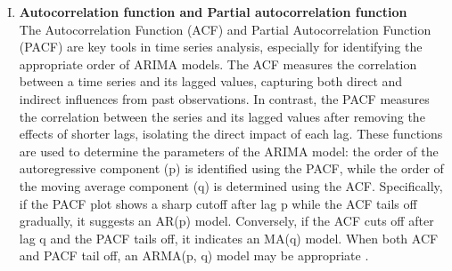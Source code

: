 \documentclass[11pt]{article}
\begin{document}
\begin{enumerate}[I. ]
    \item \textbf{Autocorrelation function and Partial autocorrelation function}\\
    The Autocorrelation Function (ACF) and Partial Autocorrelation Function (PACF) are key tools in time series analysis, especially for identifying the appropriate order of ARIMA models. The ACF measures the correlation between a time series and its lagged values, capturing both direct and indirect influences from past observations. In contrast, the PACF measures the correlation between the series and its lagged values after removing the effects of shorter lags, isolating the direct impact of each lag. These functions are used to determine the parameters of the ARIMA model: the order of the autoregressive component (p) is identified using the PACF, while the order of the moving average component (q) is determined using the ACF. Specifically, if the PACF plot shows a sharp cutoff after lag p while the ACF tails off gradually, it suggests an AR(p) model. Conversely, if the ACF cuts off after lag q and the PACF tails off, it indicates an MA(q) model. When both ACF and PACF tail off, an ARMA(p, q) model may be appropriate \citep{acf}.


\end{enumerate}
\end{document}
